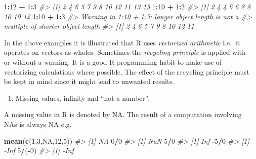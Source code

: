 \documentclass[
]{book}
\newenvironment{Shaded}{\begin{snugshade}}{\end{snugshade}}
\newcommand{\CommentTok}[1]{\textcolor[rgb]{0.56,0.35,0.01}{\textit{#1}}}
\newcommand{\ConstantTok}[1]{\textcolor[rgb]{0.56,0.35,0.01}{#1}}
\newcommand{\DecValTok}[1]{\textcolor[rgb]{0.00,0.00,0.81}{#1}}
\newcommand{\FunctionTok}[1]{\textcolor[rgb]{0.13,0.29,0.53}{\textbf{#1}}}
\newcommand{\NormalTok}[1]{#1}
\newcommand{\SpecialCharTok}[1]{\textcolor[rgb]{0.81,0.36,0.00}{\textbf{#1}}}
\providecommand{\tightlist}{%
  \setlength{\itemsep}{0pt}\setlength{\parskip}{0pt}}
\begin{document}
\begin{Shaded}
\begin{Highlighting}[]
\DecValTok{1}\SpecialCharTok{:}\DecValTok{12} \SpecialCharTok{+} \DecValTok{1}\SpecialCharTok{:}\DecValTok{3}
\CommentTok{\#\textgreater{}  [1]  2  4  6  5  7  9  8 10 12 11 13 15}
\DecValTok{1}\SpecialCharTok{:}\DecValTok{10} \SpecialCharTok{+} \DecValTok{1}\SpecialCharTok{:}\DecValTok{2}
\CommentTok{\#\textgreater{}  [1]  2  4  4  6  6  8  8 10 10 12}
\DecValTok{1}\SpecialCharTok{:}\DecValTok{10} \SpecialCharTok{+} \DecValTok{1}\SpecialCharTok{:}\DecValTok{3}
\CommentTok{\#\textgreater{} Warning in 1:10 + 1:3: longer object length is not a}
\CommentTok{\#\textgreater{} multiple of shorter object length}
\CommentTok{\#\textgreater{}  [1]  2  4  6  5  7  9  8 10 12 11}
\end{Highlighting}
\end{Shaded}

In the above examples it is illustrated that R uses \emph{{vectorized arithmetic}} i.e.~it operates on vectors as wholes. Sometimes the \emph{{recycling principle}} is applied with or without a warning. It is a good R programming habit to make use of vectorizing calculations where possible. The effect of the recycling principle must be kept in mind since it might lead to unwanted results.

\begin{enumerate}
\def\labelenumi{(\alph{enumi})}
\setcounter{enumi}{2}
\tightlist
\item
  Missing values, infinity and ``not a number''.
\end{enumerate}

A missing value in R is denoted by NA. The result of a computation involving NAs is always NA e.g.

\begin{Shaded}
\begin{Highlighting}[]
\FunctionTok{mean}\NormalTok{(}\FunctionTok{c}\NormalTok{(}\DecValTok{1}\NormalTok{,}\DecValTok{3}\NormalTok{,}\ConstantTok{NA}\NormalTok{,}\DecValTok{12}\NormalTok{,}\DecValTok{5}\NormalTok{))}
\CommentTok{\#\textgreater{} [1] NA}
\DecValTok{0}\SpecialCharTok{/}\DecValTok{0}
\CommentTok{\#\textgreater{} [1] NaN}
\DecValTok{5}\SpecialCharTok{/}\DecValTok{0}
\CommentTok{\#\textgreater{} [1] Inf}
\SpecialCharTok{{-}}\DecValTok{5}\SpecialCharTok{/}\DecValTok{0}
\CommentTok{\#\textgreater{} [1] {-}Inf}
\DecValTok{5}\SpecialCharTok{/}\NormalTok{(}\SpecialCharTok{{-}}\DecValTok{0}\NormalTok{)}
\CommentTok{\#\textgreater{} [1] {-}Inf}
\end{Highlighting}
\end{Shaded}
\end{document}
